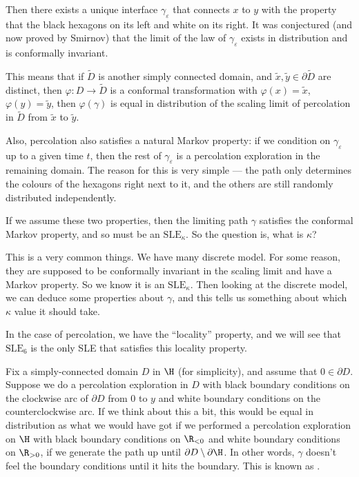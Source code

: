 \documentclass[a4paper]{article}
\newcommand\SLE{\mathrm{SLE}}
\begin{document}
Then there exists a unique interface $\gamma_\varepsilon$ that connects $x$ to $y$ with the property that the black hexagons on its left and white on its right. It was conjectured (and now proved by Smirnov) that the limit of the law of $\gamma_\varepsilon$ exists in distribution and is conformally invariant.

This means that if $\tilde{D}$ is another simply connected domain, and $\tilde{x}, \tilde{y} \in \partial \tilde{D}$ are distinct, then $\varphi: D \to \tilde{D}$ is a conformal transformation with $\varphi(x) = \tilde{x}$, $\varphi(y) = \tilde{y}$, then $\varphi(\gamma)$ is equal in distribution of the scaling limit of percolation in $\tilde{D}$ from $\tilde{x}$ to $\tilde{y}$.

Also, percolation also satisfies a natural Markov property: if we condition on $\gamma_\varepsilon$ up to a given time $t$, then the rest of $\gamma_\varepsilon$ is a percolation exploration in the remaining domain. The reason for this is very simple --- the path only determines the colours of the hexagons right next to it, and the others are still randomly distributed independently.

If we assume these two properties, then the limiting path $\gamma$ satisfies the conformal Markov property, and so must be an $\SLE_\kappa$. So the question is, what is $\kappa$?

This is a very common things. We have many discrete model. For some reason, they are supposed to be conformally invariant in the scaling limit and have a Markov property. So we know it is an $\SLE_\kappa$. Then looking at the discrete model, we can deduce some properties about $\gamma$, and this tells us something about which $\kappa$ value it should take.

In the case of percolation, we have the ``locality'' property, and we will see that $\SLE_6$ is the only SLE that satisfies this locality property.

Fix a simply-connected domain $D$ in $\H$ (for simplicity), and assume that $0 \in \partial D$. Suppose we do a percolation exploration in $D$ with black boundary conditions on the clockwise arc of $\partial D$ from $0$ to $y$ and white boundary conditions on the counterclockwise arc. If we think about this a bit, this would be equal in distribution as what we would have got if we performed a percolation exploration on $\H$ with black boundary conditions on $\R_{<0}$ and white boundary conditions on $\R_{>0}$, if we generate the path up until $\partial D \setminus \partial \H$. In other words, $\gamma$ doesn't feel the boundary conditions until it hits the boundary. This is known as .
\end{document}
